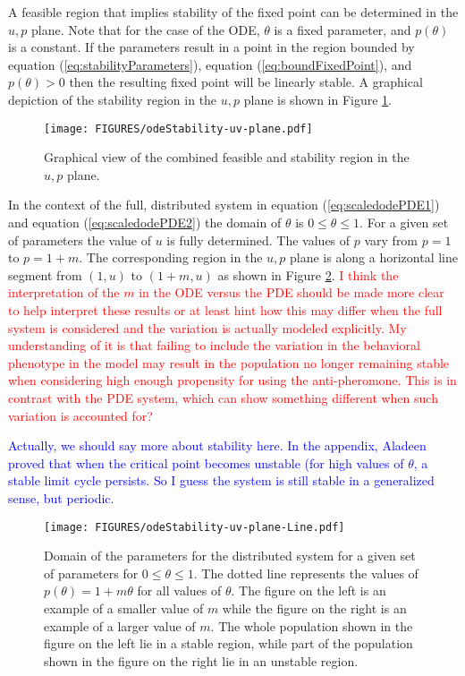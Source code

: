 \documentclass[review,authoryear]{elsarticle}
\begin{document}
A feasible region that implies stability of the fixed point can be
determined in the $u,p$ plane. Note that for the case of the ODE, $\theta$ is a fixed parameter, and $p(\theta)$ is a constant. If the parameters result in a point in
the region bounded by equation (\ref{eq:stabilityParameters}),
equation (\ref{eq:boundFixedPoint}), and $p(\theta)>0$ then the resulting
fixed point will be linearly stable. A graphical depiction of the
stability region in the $u,p$ plane is shown in Figure
\ref{fig:uvStabilityRegion}.

\begin{figure}[htb]
  \centering
  \texttt{[image: FIGURES/odeStability-uv-plane.pdf]}
  \caption[Stability region in the $u,p$ plane.]{Graphical view of the
    combined feasible and stability region in the $u,p$ plane.}
  \label{fig:uvStabilityRegion}
\end{figure}

In the context of the full, distributed system in equation
(\ref{eq:scaledodePDE1}) and equation (\ref{eq:scaledodePDE2}) the
domain of $\theta$ is $0\leq\theta\leq 1$. For a given set of
parameters the value of $u$ is fully determined. The values of $p$
vary from $p=1$ to $p=1+m$.  The corresponding region in the $u,p$
plane is along a horizontal line segment from $(1,u)$ to
$(1+m,u)$ as shown in Figure \ref{fig:distributedLineSegment}. \textcolor{red}{ I think the interpretation of the $m$ in the ODE versus the PDE should be made more clear to help interpret these results or at least hint how this may differ when the full system is considered and the variation is actually modeled explicitly. My understanding of it is that failing to include the variation in the behavioral phenotype in the model may result in the population no longer remaining stable when considering high enough propensity for using the anti-pheromone. This is in contrast with the PDE system, which can show something different when such variation is accounted for?}

\textcolor{blue}  {Actually, we should say more about stability here.  In the appendix, Aladeen proved that when the critical point becomes unstable (for high values of $\theta$, a stable limit cycle persists.  So I guess the system is still stable in a generalized sense, but periodic.}

\begin{figure}[htb]
  \centering
  \texttt{[image: FIGURES/odeStability-uv-plane-Line.pdf]}
  \caption[Domain of the distributed system in the $u,p$
  plane.]{Domain of the parameters for the distributed system for a
    given set of parameters for $0\leq\theta\leq 1$. The dotted line
    represents the values of $p(\theta)=1+m\theta$ for all
    values of $\theta$. The figure on the left is an example of a
    smaller value of $m$ while the figure on the right is an example
    of a larger value of $m$. The whole population shown in the figure
    on the left lie in a stable region, while part of the population
    shown in the figure on the right lie in an unstable region.}
  \label{fig:distributedLineSegment}
\end{figure}
\end{document}
